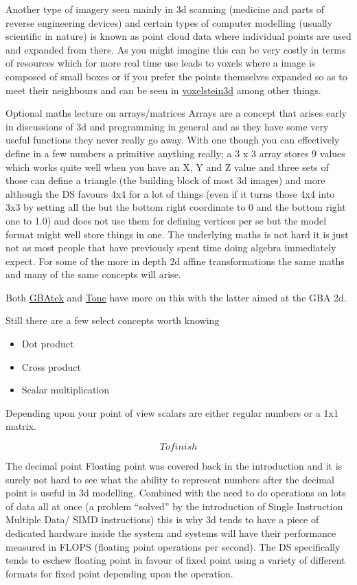 \documentclass[
]{book}
\providecommand{\tightlist}{%
  \setlength{\itemsep}{0pt}\setlength{\parskip}{0pt}}
\begin{document}
Another type of imagery seen mainly in 3d scanning (medicine and parts of reverse engineering devices) and certain types of computer modelling (usually scientific in nature) is known as point cloud data where individual points are used and expanded from there. As you might imagine this can be very costly in terms of resources which for more real time use leads to voxels where a image is composed of small boxes or if you prefer the points themselves expanded so as to meet their neighbours and can be seen in \href{http://voxelstein3d.sourceforge.net/}{voxelstein3d} among other things.

Optional maths lecture on arrays/matrices Arrays are a concept that arises early in discussions of 3d and programming in general and as they have some very useful functions they never really go away. With one though you can effectively define in a few numbers a primitive anything really; a 3 x 3 array stores 9 values which works quite well when you have an X, Y and Z value and three sets of those can define a triangle (the building block of most 3d images) and more although the DS favours 4x4 for a lot of things (even if it turns those 4x4 into 3x3 by setting all the but the bottom right coordinate to 0 and the bottom right one to 1.0) and does not use them for defining vertices per se but the model format might well store things in one. The underlying maths is not hard it is just not as most people that have previously spent time doing algebra immediately expect. For some of the more in depth 2d affine transformations the same maths and many of the same concepts will arise.

Both \href{http://problemkaputt.de/gbatek.htm\#ds3dmatrixexamplesmathsbasics}{GBAtek} and \href{http://www.coranac.com/tonc/text/matrix.htm}{Tonc} have more on this with the latter aimed at the GBA 2d.

Still there are a few select concepts worth knowing

\begin{itemize}
\tightlist
\item
  Dot product
\item
  Cross product
\item
  Scalar multiplication
\end{itemize}

Depending upon your point of view scalars are either regular numbers or a 1x1 matrix.

\[To finish\]

The decimal point Floating point was covered back in the introduction and it is surely not hard to see what the ability to represent numbers after the decimal point is useful in 3d modelling. Combined with the need to do operations on lots of data all at once (a problem ``solved'' by the introduction of Single Instruction Multiple Data/ SIMD instructions) this is why 3d tends to have a piece of dedicated hardware inside the system and systems will have their performance measured in FLOPS (floating point operations per second). The DS specifically tends to eschew floating point in favour of fixed point using a variety of different formats for fixed point depending upon the operation.
\end{document}
